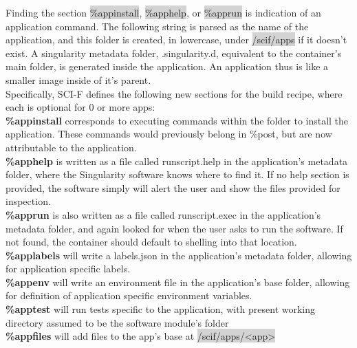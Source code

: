 \documentclass[a4paper]{article}
\newcounter{subsubsubsection}[subsubsection]
\begin{document}
	
	Finding the section \colorbox{lightgray}{\%appinstall}, \colorbox{lightgray}{\%apphelp}, or \colorbox{lightgray}{\%apprun} is indication of an application command. The following string is parsed as the name of the application, and this folder is created, in lowercase, under \colorbox{lightgray}{/scif/apps} if it doesn’t exist. A singularity metadata folder, .singularity.d, equivalent to the container’s main folder, is generated inside the application. An application thus is like a smaller image inside of it’s parent.\\[0.1in]
	
	
	Specifically, SCI-F defines the following new sections for the build recipe, where each is optional for 0 or more apps:\\[0.1in]
	
\textbf{\%appinstall} corresponds to executing commands within the folder to install the application. These commands would previously belong in \%post, but are now attributable to the application.\\[0.1in]

\textbf{\%apphelp} is written as a file called runscript.help in the application’s metadata folder, where the Singularity software knows where to find it. If no help section is provided, the software simply will alert the user and show the files provided for inspection.\\[0.1in]

\textbf{\%apprun} is also written as a file called runscript.exec in the application’s metadata folder, and again looked for when the user asks to run the software. If not found, the container should default to shelling into that location.\\[0.1in]

\textbf{\%applabels} will write a labels.json in the application’s metadata folder, allowing for application specific labels.\\[0.1in]

\textbf{\%appenv} will write an environment file in the application’s base folder, allowing for definition of application specific environment variables.\\[0.1in]

\textbf{\%apptest} will run tests specific to the application, with present working directory assumed to be the software module’s folder\\[0.1in]

\textbf{\%appfiles} will add files to the app’s base at \colorbox{lightgray}{/scif/apps/\textless{app}\textgreater}
\end{document}
